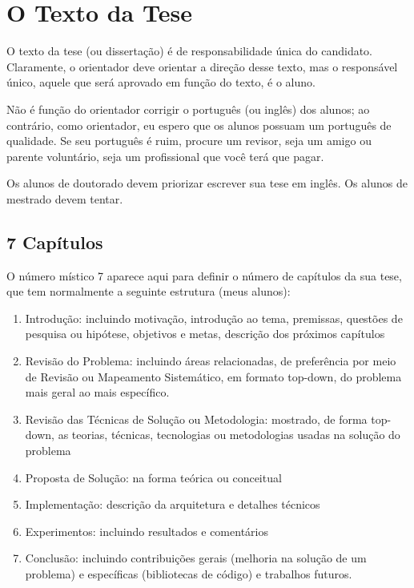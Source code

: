 \chapter{O Texto da Tese}

O texto da tese (ou dissertação) é de responsabilidade única do candidato. Claramente, o orientador deve orientar a direção desse texto, mas o responsável único, aquele que será aprovado em função do texto, é o aluno.

Não é função do orientador corrigir o português (ou inglês) dos alunos; ao contrário, como orientador, eu espero que os alunos possuam um português de qualidade. Se seu português é ruim, procure um revisor, seja um amigo ou parente voluntário, seja um profissional que você terá que pagar.

Os alunos de doutorado devem priorizar escrever sua tese em inglês. Os alunos de mestrado devem tentar.


\section{7 Capítulos }
O número místico 7 aparece aqui para definir o número de capítulos da sua tese, que tem normalmente a seguinte estrutura (meus alunos):
\begin{enumerate}
\item	Introdução: incluindo motivação, introdução ao tema, premissas, questões de pesquisa ou hipótese, objetivos e metas, descrição dos próximos capítulos
\item	Revisão do Problema: incluindo áreas relacionadas, de preferência por meio de Revisão ou Mapeamento Sistemático, em formato top-down, do problema mais geral ao mais específico.
\item	Revisão das Técnicas de Solução ou Metodologia: mostrado, de forma top-down, as teorias, técnicas, tecnologias ou metodologias usadas na solução do problema
\item	Proposta de Solução: na forma teórica ou conceitual
\item	Implementação: descrição da arquitetura e detalhes técnicos
\item	Experimentos: incluindo resultados e comentários
\item	Conclusão: incluindo contribuições gerais (melhoria na solução de um problema) e específicas (bibliotecas de código) e trabalhos futuros.
\end{enumerate}


